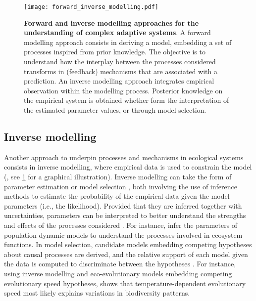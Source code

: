 \begin{figure}[t]
    \centering
    \texttt{[image: forward\_inverse\_modelling.pdf]}
    \caption{\textbf{Forward and inverse modelling approaches for the understanding of complex adaptive systems}. A forward modelling approach consists in deriving a model, embedding a set of processes inspired from prior knowledge. The objective is to understand how the interplay between the processes considered transforms in (feedback) mechanisms that are associated with a prediction. An inverse modelling approach integrates empirical observation within the modelling process. Posterior knowledge on the empirical system is obtained whether form the interpretation of the estimated parameter values, or through model selection.
    }
    \label{fig:forward_inverse_modelling}
\end{figure}

\subsection{Inverse modelling}
Another approach to underpin processes and mechanisms in ecological systems consists in inverse modelling, where empirical data is used to constrain the model (\cite{Clermont2015}, see \cref{fig:forward_inverse_modelling} for a graphical illustration).
% 
Inverse modelling can take the form of parameter estimation \citep{Schartau2017} or model selection \citep{Johnson2004}, both involving the use of inference methods to estimate the probability of the empirical data given the model parameters (i.e., the likelihood).
% 
Provided that they are inferred together with uncertainties, parameters can be interpreted to better understand the strengths and effects of the processes considered \citep{Pontarp2019}. For instance, \cite{Higgins2010,Curtsdotter2019} infer the parameters of population dynamic models to understand the processes involved in ecosystem functions.
%
In model selection, candidate models embedding competing hypotheses about causal processes are derived, and the relative support of each model given the data is computed to discriminate between the hypotheses \citep{Johnson2004}. For instance, using inverse modelling and eco-evolutionary models embedding competing evolutionary speed hypotheses, \citep{Skeels2022} shows that temperature-dependent evolutionary speed most likely explains variations in biodiversity patterns.

